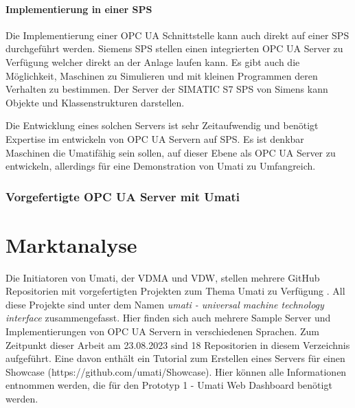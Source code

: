 \documentclass[a4paper, 12pt, oneside, toc=listofnumbered, bibliography=totoc]{scrbook}
\begin{document}
			
			\paragraph{Implementierung in einer SPS}
			Die Implementierung einer OPC UA Schnittstelle kann auch direkt auf einer SPS durchgeführt werden. Siemens SPS stellen einen integrierten OPC UA Server zu Verfügung welcher direkt an der Anlage laufen kann. Es gibt auch die Möglichkeit, Maschinen zu Simulieren und mit kleinen Programmen deren Verhalten zu bestimmen. Der Server der SIMATIC S7 SPS von Simens kann Objekte und Klassenstrukturen darstellen. \cite{noauthor_tia_2019}
			
			Die Entwicklung eines solchen Servers ist sehr Zeitaufwendig und benötigt Expertise im entwickeln von OPC UA Servern auf SPS. Es ist denkbar Maschinen die Umatifähig sein sollen, auf dieser Ebene als OPC UA Server zu entwickeln, allerdings für eine Demonstration von Umati zu Umfangreich.
			
			\subsubsection{Vorgefertigte OPC UA Server mit Umati}
			
			
			
	
	\section{Marktanalyse}
		
		Die Initiatoren von Umati, der \ac{VDMA} und \ac{VDW}, stellen mehrere GitHub Repositorien mit vorgefertigten Projekten zum Thema Umati zu Verfügung \cite{noauthor_github_nodate}. All diese Projekte sind unter dem Namen \textit{umati - universal machine technology interface} zusammengefasst. Hier finden sich auch mehrere Sample Server und Implementierungen von OPC UA Servern in verschiedenen Sprachen. Zum Zeitpunkt dieser Arbeit am 23.08.2023 sind 18 Repositorien in diesem Verzeichnis aufgeführt. Eine davon enthält ein Tutorial zum Erstellen eines Servers für einen Showcase (https://github.com/umati/Showcase). Hier können alle Informationen entnommen werden, die für den Prototyp 1 - Umati Web Dashboard benötigt werden.
		
\end{document}
